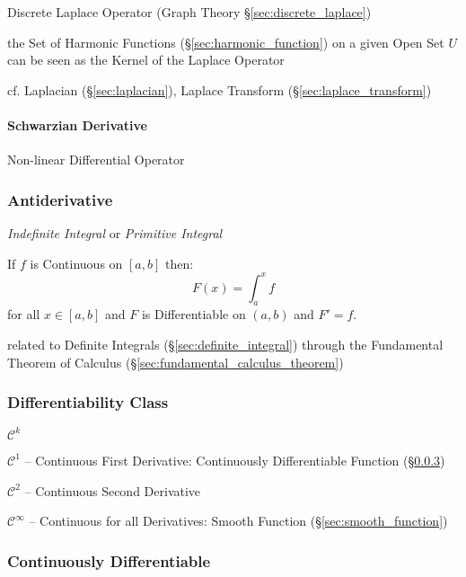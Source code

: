 Discrete Laplace Operator (Graph Theory \S\ref{sec:discrete_laplace})

the Set of Harmonic Functions (\S\ref{sec:harmonic_function}) on a given Open
Set $U$ can be seen as the Kernel of the Laplace Operator

\fist cf. Laplacian (\S\ref{sec:laplacian}), Laplace Transform
(\S\ref{sec:laplace_transform})



\paragraph{Schwarzian Derivative}\label{sec:schwarzian_derivative}\hfill

Non-linear Differential Operator



\subsubsection{Antiderivative}\label{sec:antiderivative}

\emph{Indefinite Integral} or \emph{Primitive Integral}

If $f$ is Continuous on $[a,b]$ then:
\[
  F(x) = \int_a^x f
\]
for all $x \in [a,b]$ and $F$ is Differentiable on $(a,b)$ and $F' = f$.

\fist related to Definite Integrals (\S\ref{sec:definite_integral}) through the
Fundamental Theorem of Calculus (\S\ref{sec:fundamental_calculus_theorem})



\subsubsection{Differentiability Class}\label{sec:differentiability_class}

$\mathcal{C}^k$

$\mathcal{C}^1$ -- Continuous First Derivative: Continuously Differentiable
Function (\S\ref{sec:continuously_differentiable})

$\mathcal{C}^2$ -- Continuous Second Derivative

$\mathcal{C}^\infty$ -- Continuous for all Derivatives: Smooth Function
(\S\ref{sec:smooth_function})



\subsubsection{Continuously Differentiable}
\label{sec:continuously_differentiable}

